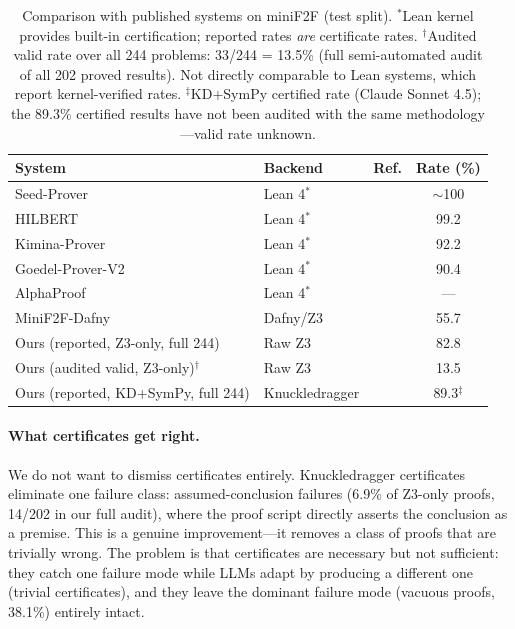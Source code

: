 \documentclass[11pt]{article}
\begin{document}
\begin{table}[t]
\centering
\caption{Comparison with published systems on miniF2F (test split). $^*$Lean kernel provides built-in certification; reported rates \emph{are} certificate rates. $^\dagger$Audited valid rate over all 244 problems: 33/244 = 13.5\% (full semi-automated audit of all 202 proved results). Not directly comparable to Lean systems, which report kernel-verified rates. $^{\ddagger}$KD+SymPy certified rate (Claude Sonnet 4.5); the 89.3\% certified results have not been audited with the same methodology---valid rate unknown.}
\label{tab:comparison}
\small
\begin{tabular}{@{}lllc@{}}
\toprule
\textbf{System} & \textbf{Backend} & \textbf{Ref.} & \textbf{Rate (\%)} \\
\midrule
Seed-Prover & Lean 4$^*$ & \cite{seedprover2025} & $\sim$100 \\
HILBERT & Lean 4$^*$ & \cite{hilbert2025} & 99.2 \\
Kimina-Prover & Lean 4$^*$ & \cite{kimina2025} & 92.2 \\
Goedel-Prover-V2 & Lean 4$^*$ & \cite{goedel2025} & 90.4 \\
AlphaProof & Lean 4$^*$ & \cite{alphaproof2025} & --- \\
\midrule
MiniF2F-Dafny & Dafny/Z3 & \cite{minif2fdafny2026} & 55.7 \\
\midrule
Ours (reported, Z3-only, full 244) & Raw Z3 & & 82.8 \\
Ours (audited valid, Z3-only)$^\dagger$ & Raw Z3 & & 13.5 \\
Ours (reported, KD+SymPy, full 244) & Knuckledragger & & 89.3$^{\ddagger}$ \\
\bottomrule
\end{tabular}
\end{table}

\paragraph{What certificates get right.} We do not want to dismiss certificates entirely. Knuckledragger certificates eliminate one failure class: assumed-conclusion failures (6.9\% of Z3-only proofs, 14/202 in our full audit), where the proof script directly asserts the conclusion as a premise. This is a genuine improvement---it removes a class of proofs that are trivially wrong. The problem is that certificates are necessary but not sufficient: they catch one failure mode while LLMs adapt by producing a different one (trivial certificates), and they leave the dominant failure mode (vacuous proofs, 38.1\%) entirely intact.
\end{document}
